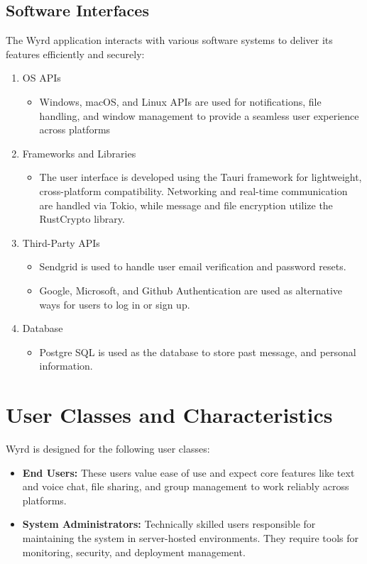 \documentclass{scrreprt}
\begin{document}
    \subsection{Software Interfaces}
    The Wyrd application interacts with various software systems to deliver its features efficiently and securely:
        \begin{enumerate}
            \item OS APIs
            \begin{itemize}
                \item Windows, macOS, and Linux APIs are used for notifications, file handling, and window management to provide a seamless user experience across platforms
            \end{itemize}
            \item Frameworks and Libraries
            \begin{itemize}
                \item The user interface is developed using the Tauri framework for lightweight, cross-platform compatibility. Networking and real-time communication are handled via Tokio, while message and file encryption utilize the RustCrypto library.
            \end{itemize}
            \item Third-Party APIs
            \begin{itemize}
                \item Sendgrid is used to handle user email verification and password resets.
                \item Google, Microsoft, and Github Authentication are used as alternative ways for users to log in or sign up.
            \end{itemize}
            \item Database
            \begin{itemize}
                \item Postgre SQL is used as the database to store past message, and personal information.
            \end{itemize}
        \end{enumerate}
\section{User Classes and Characteristics}
Wyrd is designed for the following user classes:
\begin{itemize}
    \item \textbf{End Users: }These users value ease of use and expect core features like text and voice chat, file sharing, and group management to work reliably across platforms.
    \item \textbf{System Administrators: }Technically skilled users responsible for maintaining the system in server-hosted environments. They require tools for monitoring, security, and deployment management.
\end{itemize}
\end{document}
